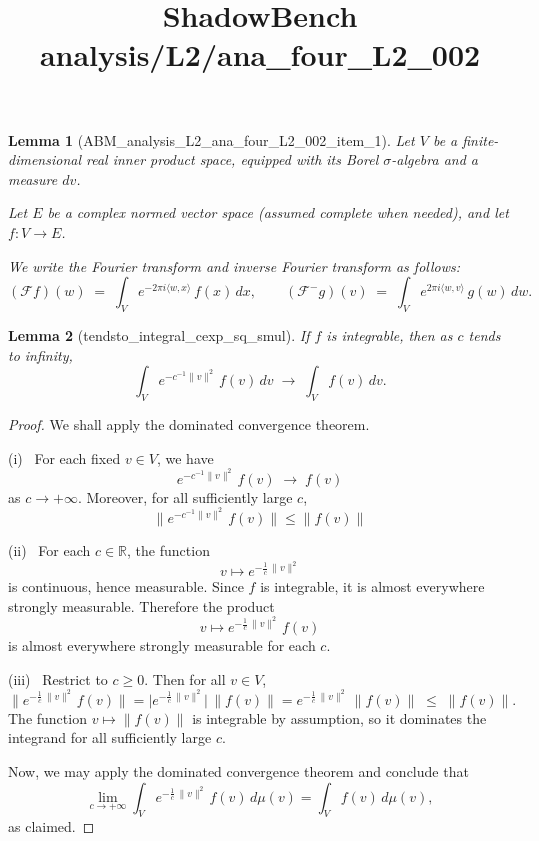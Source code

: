 \documentclass{article}
\title{ShadowBench analysis/L2/ana\_four\_L2\_002}
\newtheorem{lemma}{Lemma}
\begin{document}
\maketitle

\begin{lemma}[ABM_analysis_L2_ana_four_L2_002_item_1]
Let $V$ be a finite-dimensional real inner product space, equipped with its Borel $\sigma$-algebra and a measure $dv$.

Let $E$ be a complex normed vector space (assumed complete when needed), and let $f : V \to E$.

We write the Fourier transform and inverse Fourier transform as follows:
\[
(\mathcal{F}f)(w) \;=\; \int_V e^{-2\pi i \langle w,x\rangle}\, f(x)\,dx,
\qquad
(\mathcal{F}^{-}g)(v) \;=\; \int_V e^{2\pi i \langle w,v\rangle}\, g(w)\,dw.
\]
\end{lemma}


\begin{lemma}[tendsto_integral_cexp_sq_smul] If $f$ is integrable, then as $c$ tends to infinity,
\[
\int_V e^{-c^{-1}\|v\|^2}\, f(v)\,dv
\;\xrightarrow{}\;
\int_V f(v)\,dv .
\]
\end{lemma}
\begin{proof}
We shall apply the dominated convergence theorem. 

(i) \, For each fixed $v \in V$, we have
\[e^{-c^{-1}\|v\|^2}\, f(v)
\;\longrightarrow\;
f(v)\]
as $c \to +\infty$. Moreover, for all sufficiently large $c$,
\[
\|e^{-c^{-1}\|v\|^2}\, f(v)\| \le \|f(v)\|
\]

(ii) \, For each $c \in \mathbb{R}$, the function
\[
v \longmapsto e^{-\frac{1}{c}\,\|v\|^2}
\]
is continuous, hence measurable. Since $f$ is integrable, it is
almost everywhere strongly measurable. Therefore the product
\[
v \longmapsto e^{-\frac{1}{c}\,\|v\|^2}\, f(v)
\]
is almost everywhere strongly measurable for each $c$.

(iii) \, Restrict to $c \ge 0$. Then for all $v \in V$,
\[
\bigl\| e^{-\frac{1}{c}\,\|v\|^2}\, f(v) \bigr\|
=
\bigl| e^{-\frac{1}{c}\,\|v\|^2} \bigr|\, \|f(v)\|
=
e^{-\frac{1}{c}\,\|v\|^2}\, \|f(v)\|
\;\le\;
\|f(v)\|.
\]
The function $v \mapsto \|f(v)\|$ is integrable by assumption, so it
dominates the integrand for all sufficiently large $c$.

Now, we may apply the dominated convergence theorem and conclude that
\[
\lim_{c \to +\infty}
\int_V e^{-\frac{1}{c}\,\|v\|^2}\, f(v)\, d\mu(v)
=
\int_V f(v)\, d\mu(v),
\]
as claimed.
\end{proof}
\end{document}
